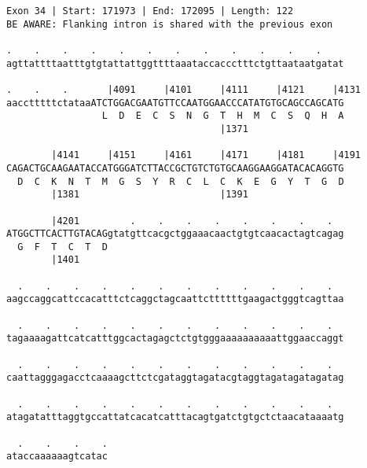 \documentclass{article}
\begin{document}
\begin{Verbatim}
Exon 34 | Start: 171973 | End: 172095 | Length: 122
BE AWARE: Flanking intron is shared with the previous exon
 
.    .    .    .    .    .    .    .    .    .    .    .    
agttattttaatttgtgtattattggttttaaataccaccctttctgttaataatgatat
  
.    .    .       |4091     |4101     |4111     |4121     |4131
aacctttttctataaATCTGGACGAATGTTCCAATGGAACCCATATGTGCAGCCAGCATG
                 L  D  E  C  S  N  G  T  H  M  C  S  Q  H  A
                                      |1371                 
  
        |4141     |4151     |4161     |4171     |4181     |4191
CAGACTGCAAGAATACCATGGGATCTTACCGCTGTCTGTGCAAGGAAGGATACACAGGTG
  D  C  K  N  T  M  G  S  Y  R  C  L  C  K  E  G  Y  T  G  D
        |1381                         |1391                 
  
        |4201         .    .    .    .    .    .    .    .  
ATGGCTTCACTTGTACAGgtatgttcacgctggaaacaactgtgtcaacactagtcagag
  G  F  T  C  T  D                                          
        |1401                                               
  
  .    .    .    .    .    .    .    .    .    .    .    .  
aagccaggcattccacatttctcaggctagcaattcttttttgaagactgggtcagttaa
  
  .    .    .    .    .    .    .    .    .    .    .    .  
tagaaaagattcatcatttggcactagagctctgtgggaaaaaaaaaattggaaccaggt
  
  .    .    .    .    .    .    .    .    .    .    .    .  
caattagggagacctcaaaagcttctcgataggtagatacgtaggtagatagatagatag
  
  .    .    .    .    .    .    .    .    .    .    .    .  
atagatatttaggtgccattatcacatcatttacagtgatctgtgctctaacataaaatg
  
  .    .    .    .
ataccaaaaaagtcatac
\end{Verbatim}
\newpage
\end{document}
